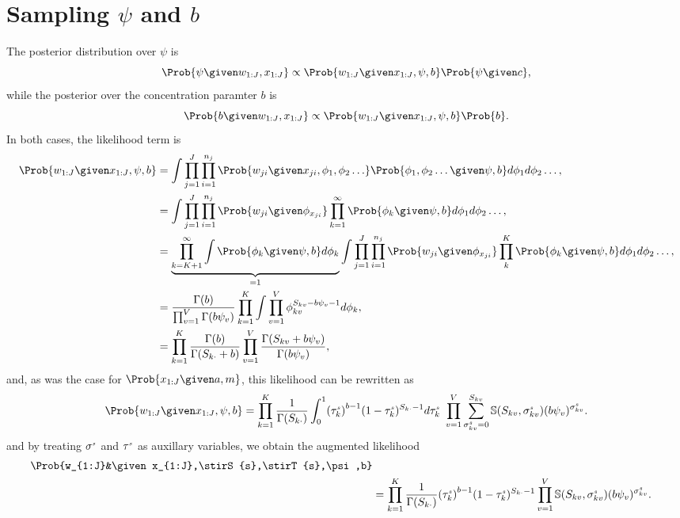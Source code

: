 \section{Sampling $\psi$ and $\mathit{b}$}
\newcommand{\phiseq}{\phi_1, \phi_2 \ldots}

The posterior distribution over $\psi$ is
\[
\Prob{\psi\given w_{1:J},x_{1:J}} \propto \Prob{w_{1:J}\given x_{1:J},\psi,b}\Prob{\psi\given c},
\]
while the posterior over the concentration paramter $b$ is
\[
\Prob{b\given w_{1:J},x_{1:J}} \propto \Prob{w_{1:J}\given x_{1:J},\psi,b}\Prob{b}.
\]
In both cases, the likelihood term is 
\begin{align*}
	\Prob{w_{1:J}\given x_{1:J},\psi,b}  
	&=
	\int
	\prod_{j=1}^J \prod_{i=1}^{n_j}
	\Prob{w_{ji} \given x_{ji}, \phiseq}
	\Prob{\phiseq \given \psi, b}
	d\phi_1 d\phi_2 \ldots,\\
	&=
	\int
	\prod_{j=1}^J \prod_{i=1}^{n_j}
	\Prob{w_{ji} \given \phi_{x_{ji}}}
		\prod_{k=1}^\infty \Prob{\phi_k \given \psi, b}
	d\phi_1 d\phi_2 \ldots,\\
	&=
	    \underbrace{
	    \prod_{k=K+1}^\infty \int\Prob{\phi_k \given \psi, b}d\phi_k
	    }_{=1}
	\int
		\prod_{j=1}^J \prod_{i=1}^{n_j} \Prob{w_{ji}\given \phi_{x_{ji}}}
		\prod_{k}^K \Prob{\phi_k \given \psi, b}
	d\phi_1 d\phi_2 \ldots,\\
	&=
	\frac{\Gamma(b)}{\prod_{v=1}^V\Gamma(b\psi_v)}
	\prod_{k=1}^K
	\int
	\prod_{v=1}^V
	\phi_{kv}^{S_{kv} - b\psi_v-1}d\phi_k,\\
	& = \prod_{k=1}^{K} \frac{\Gamma(b)}{\Gamma(S_{k\cdot}+b)} \prod_{v=1}^V \frac{\Gamma(S_{kv}+b\psi_v)}{\Gamma(b\psi_v)},
\end{align*}
and, as was the case for $\Prob{x_{1:J} \given a, m}$, this likelihood can be rewritten as 
\[
\Prob{w_{1:J}\given x_{1:J},\psi,b} 
= \prod_{k=1}^{K}
\frac{1}{\Gamma(S_{k\cdot})}\int_0^1\!{(\stirt{s}{k})}^{b-1} (1-\stirt{s}{k})^{S_{k\cdot}-1} d\stirt{s}{k}\ 
\prod_{v=1}^{V}\sum_{\stirs{s}{kv}=0}^{S_{kv}}\mathbb{S}(S_{kv},\stirs{s}{kv})(b\psi_v)^{\stirs{s}{kv}}.
\]
and by
treating $\sigma^{\text{\tiny{$s$}}}$ and $\tau^{\text{\tiny{$s$}}}$ as auxillary variables, we obtain the augmented likelihood 
\[
	\begin{split}
		\Prob{w_{1:J}&\given x_{1:J},\stirS{s},\stirT{s},\psi,b} \\
		&= \prod_{k=1}^{K}\frac{1}{\Gamma(S_{k\cdot})} {(\stirt{s}{k})}^{b-1} (1-\stirt{s}{k})^{S_{k\cdot}-1} \prod_{v=1}^{V}\mathbb{S}(S_{kv},\stirs{s}{kv})(b\psi_v)^{\stirs{s}{kv}}.
	\end{split}
\]

